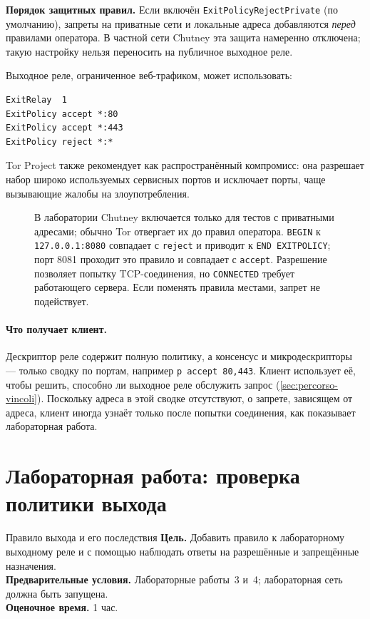 \textbf{Порядок защитных правил.} Если включён \texttt{ExitPolicyRejectPrivate} (по умолчанию), запреты на приватные сети и локальные адреса добавляются \emph{перед} правилами оператора. В частной сети Chutney эта защита намеренно отключена; такую настройку нельзя переносить на публичное выходное реле.

Выходное реле, ограниченное веб-трафиком, может использовать:
\begin{lstlisting}[numbers=none]
ExitRelay  1
ExitPolicy accept *:80
ExitPolicy accept *:443
ExitPolicy reject *:*
\end{lstlisting}
Tor Project также рекомендует  как распространённый компромисс: она разрешает набор широко используемых сервисных портов и исключает порты, чаще вызывающие жалобы на злоупотребления.

\begin{figure}[htbp]
\centering

\caption{В лаборатории Chutney  включается только для тестов с приватными адресами; обычно Tor отвергает их до правил оператора. \texttt{BEGIN} к \texttt{127.0.0.1:8080} совпадает с \texttt{reject} и приводит к \texttt{END EXITPOLICY}; порт 8081 проходит это правило и совпадает с \texttt{accept}. Разрешение позволяет попытку TCP-соединения, но \texttt{CONNECTED} требует работающего сервера. Если поменять правила местами, запрет не подействует.}
\label{fig:policy}
\end{figure}

\paragraph{Что получает клиент.} Дескриптор реле содержит полную политику, а консенсус и микродескрипторы — только сводку по портам, например \texttt{p accept 80,443}. Клиент использует её, чтобы решить, способно ли выходное реле обслужить запрос (\cref{sec:percorso-vincoli}). Поскольку адреса в этой сводке отсутствуют, о запрете, зависящем от адреса, клиент иногда узнаёт только после попытки соединения, как показывает лабораторная работа.

\section{Лабораторная работа: проверка политики выхода}\label{sec:lab-relay}

\begin{laboratorio}[14]{Правило выхода и его последствия}
\textbf{Цель.} Добавить правило к лабораторному выходному реле и с помощью  наблюдать ответы на разрешённые и запрещённые назначения.\\
\textbf{Предварительные условия.} Лабораторные работы~3 и~4; лабораторная сеть должна быть запущена.\\
\textbf{Оценочное время.} 1 час.
\end{laboratorio}

